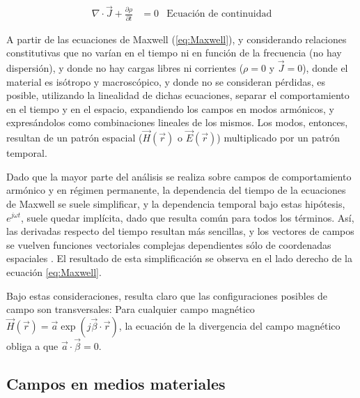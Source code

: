 \begin{align}
	\label{eq:continuidad}
	\nabla \cdot \vec{J} + \frac{\partial \rho}{\partial t} &= 0 & \text{Ecuación de continuidad}
\end{align}


A partir de las ecuaciones de Maxwell (\ref{eq:Maxwell}), y considerando relaciones constitutivas que no varían en el tiempo ni en función de la frecuencia (no hay dispersión), y donde no hay cargas libres ni corrientes ($\rho=0$ y $\vec{J}=0$), donde el material es isótropo y macroscópico, y donde no se consideran pérdidas, es posible, utilizando la linealidad de dichas ecuaciones, separar el comportamiento en el tiempo y en el espacio, expandiendo los campos en modos armónicos, y expresándolos como combinaciones lineales de los mismos. Los modos, entonces, resultan de un patrón espacial ($\vec{H}(\vec{r})$ o $\vec{E}(\vec{r})$) multiplicado por un patrón temporal.

Dado que la mayor parte del análisis se realiza sobre campos de comportamiento armónico y en régimen permanente, la dependencia del tiempo de la ecuaciones de Maxwell se suele simplificar, y la dependencia temporal bajo estas hipótesis, $e^{j \omega t}$, suele quedar implícita, dado que resulta común para todos los términos. Así, las derivadas respecto del tiempo resultan más sencillas, y los vectores de campos se vuelven funciones vectoriales complejas dependientes sólo de coordenadas espaciales \cite{Collin:GuidedWaves}. El resultado de esta simplificación se observa en el lado derecho de la ecuación \ref{eq:Maxwell}.

Bajo estas consideraciones, resulta claro que las configuraciones posibles de campo son transversales: Para cualquier campo magnético $\vec{H}(\vec{r}) = \vec{a} \exp(j \vec{\beta} \cdot \vec{r})$, la ecuación de la divergencia del campo magnético obliga a que $\vec{a} \cdot \vec{\beta} = 0$.

\subsection{Campos en medios materiales}
\label{subsec_campos_en_dielectricos}

